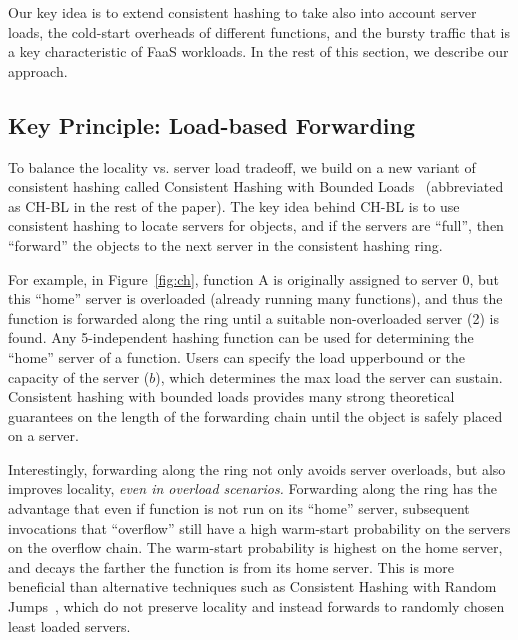 Our key idea is to extend consistent hashing to take also into account server loads, the cold-start overheads of different functions, and the bursty traffic that is a key characteristic of FaaS workloads.
In the rest of this section, we describe our approach. 


\subsection{Key Principle: Load-based Forwarding}

To balance the locality vs. server load tradeoff, we build on a new variant of consistent hashing called Consistent Hashing with Bounded Loads~\cite{mirrokni2018consistent} (abbreviated as CH-BL in the rest of the paper).  
The key idea behind CH-BL is to use consistent hashing to locate servers for objects, and if the servers are ``full'', then ``forward'' the objects to the next server in the consistent hashing ring.

For example, in Figure~\ref{fig:ch}, function A is originally assigned to server 0, but this ``home'' server is overloaded (already running many functions), and thus the function is forwarded along the ring until a suitable non-overloaded server (2) is found. 
Any 5-independent hashing function can be used for determining the ``home'' server of a function. %
Users can specify the load upperbound or the capacity of the server ($b$), which determines the max load the server can sustain.  
Consistent hashing with bounded loads provides many strong theoretical guarantees on the length of the forwarding chain until the object is safely placed on a server. 


Interestingly, forwarding along the ring not only avoids server overloads, but also improves locality, \emph{even in overload scenarios.}
Forwarding along the ring has the advantage that even if function is not run on its ``home'' server, subsequent invocations that ``overflow'' still have a high warm-start probability on the servers on the overflow chain. %
The warm-start probability is highest on the home server, and decays the farther the function is from its home server. 
This is more beneficial than alternative techniques such as Consistent Hashing with Random Jumps~\cite{chrj-aaai21}, which do not preserve locality and instead forwards to randomly chosen least loaded servers. 

